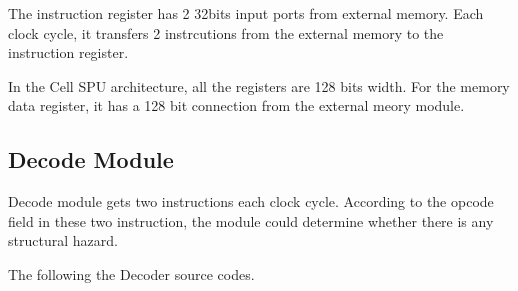 \documentclass[preprint,authoryear,12pt]{elsarticle}
\begin{document}
The instruction register has 2 32bits input ports from external
memory. Each clock cycle, it transfers 2 instrcutions from the
external memory to the instruction register.

In the Cell SPU architecture, all the registers are 128 bits
width. For the memory data register, it has a 128 bit connection from
the external meory module.

\subsection{Decode Module}

Decode module gets two instructions each clock cycle. According to the
opcode field in these two instruction, the module could determine
whether there is any structural hazard. 

The following the Decoder source codes.
\end{document}
